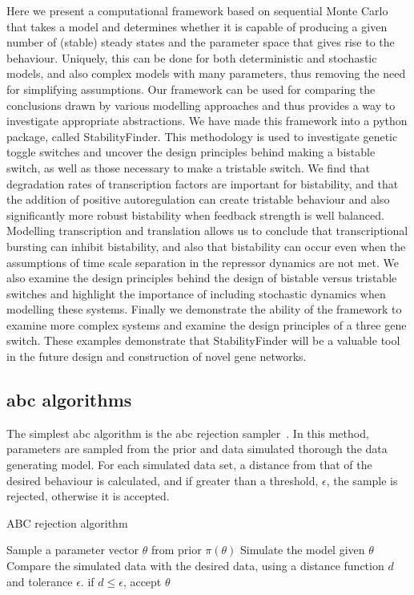 Here we present a computational framework based on sequential Monte Carlo that takes a model and determines whether it is capable of producing a given number of (stable) steady states and the parameter space that gives rise to the behaviour. Uniquely, this can be done for both deterministic and stochastic models, and also complex models with many parameters, thus removing the need for simplifying assumptions. Our framework can be used for comparing the conclusions drawn by various modelling approaches and thus provides a way to investigate appropriate abstractions. We have made this framework into a python package, called StabilityFinder. This methodology is used to investigate genetic toggle switches and uncover the design principles behind making a bistable switch, as well as those necessary to make a tristable switch. We find that degradation rates of transcription factors are important for bistability, and that the addition of positive autoregulation can create tristable behaviour and also significantly more robust bistability when feedback strength is well balanced. Modelling transcription and translation allows us to conclude that transcriptional bursting can inhibit bistability, and also that bistability can occur even when the assumptions of time scale separation in the repressor dynamics are not met. We also examine the design principles behind the design of bistable versus tristable switches and highlight the importance of including stochastic dynamics when modelling these systems. Finally we demonstrate the ability of the framework to examine more complex systems and examine the design principles of a three gene switch. These examples demonstrate that StabilityFinder will be a valuable tool in the future design and construction of novel gene networks. 


\subsection{\acrshort{abc} algorithms}

The simplest \acrshort{abc} algorithm is the \acrshort{abc} rejection sampler~\autocite{Pritchard:1999td}. In this method, parameters are sampled from the prior and data simulated thorough the data generating model. For each simulated data set, a distance from that of the desired behaviour is calculated, and if greater than a threshold, $\epsilon$, the sample is rejected, otherwise it is accepted. 
\begin{algorithm}[H]
	\label{alg:ABC}
  \caption{ABC rejection algorithm}
 \begin{algorithmic}[1]
    \Statex
	\State Sample a parameter vector $\theta$ from prior $\pi(\theta)$
	\State Simulate the model given $\theta$
    \State Compare the simulated data with the desired data, using a distance function $d$ and tolerance $\epsilon$. if $d \leq \epsilon$, accept $\theta$ 
   
  \end{algorithmic}
\end{algorithm}


